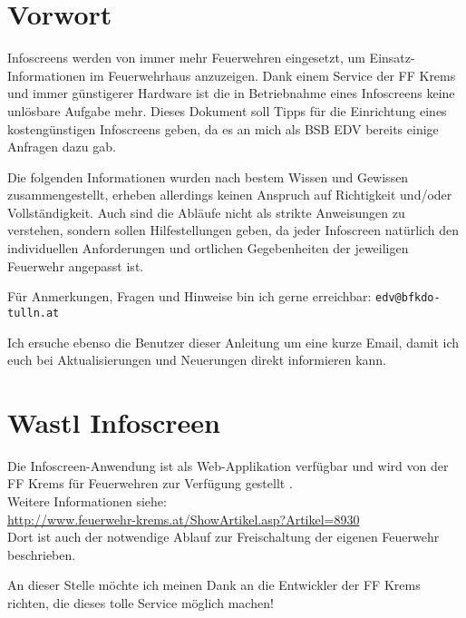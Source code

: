 \section{Vorwort}
Infoscreens werden von immer mehr Feuerwehren eingesetzt, um Einsatz-Informationen im Feuerwehrhaus anzuzeigen.
Dank einem Service der FF Krems \cite{wastl} und immer günstigerer Hardware ist die in Betriebnahme eines Infoscreens keine unlösbare Aufgabe mehr.
Dieses Dokument soll Tipps für die Einrichtung eines kostengünstigen Infoscreens geben, da es an mich als BSB EDV bereits einige Anfragen dazu gab.

Die folgenden Informationen wurden nach bestem Wissen und Gewissen zusammengestellt, erheben allerdings keinen Anspruch auf Richtigkeit und/oder Vollständigkeit.
Auch sind die Abläufe nicht als strikte Anweisungen zu verstehen, sondern sollen Hilfestellungen geben, 
da jeder Infoscreen natürlich den individuellen Anforderungen und ortlichen Gegebenheiten der jeweiligen Feuerwehr angepasst ist.

Für Anmerkungen, Fragen und Hinweise bin ich gerne erreichbar: \verb|edv@bfkdo-tulln.at|

Ich ersuche ebenso die Benutzer dieser Anleitung um eine kurze Email, damit ich euch bei Aktualisierungen und Neuerungen direkt informieren kann.

\section{Wastl Infoscreen}
\label{sec:wastl}
Die Infoscreen-Anwendung ist als Web-Applikation verfügbar und wird von der FF Krems für Feuerwehren zur Verfügung gestellt \cite{wastl}.\\
Weitere Informationen siehe:\\
\url{http://www.feuerwehr-krems.at/ShowArtikel.asp?Artikel=8930}\\
Dort ist auch der notwendige Ablauf zur Freischaltung der eigenen Feuerwehr beschrieben.

An dieser Stelle möchte ich meinen Dank an die Entwickler der FF Krems richten, die dieses tolle Service möglich machen!


